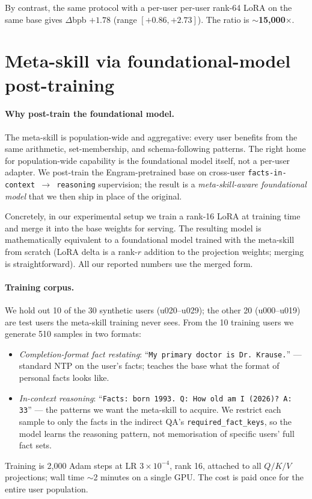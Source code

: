 \documentclass{article}
\begin{document}
By contrast, the same protocol with a per-user per-user rank-64 LoRA on
the same base gives $\Delta$bpb $+1.78$ (range $[+0.86, +2.73]$). The
ratio is \textbf{$\sim$15{,}000$\times$}.


\section{Meta-skill via foundational-model post-training}
\label{sec:metaskill}

\paragraph{Why post-train the foundational model.}
The meta-skill is population-wide and aggregative: every user benefits
from the same arithmetic, set-membership, and schema-following
patterns. The right home for population-wide capability is the
foundational model itself, not a per-user adapter. We post-train the
Engram-pretrained base on cross-user
\texttt{facts-in-context $\to$ reasoning} supervision; the result is a
\emph{meta-skill-aware foundational model} that we then ship in place
of the original.

Concretely, in our experimental setup we train a rank-16 LoRA at
training time and merge it into the base weights for serving. The
resulting model is mathematically equivalent to a foundational model
trained with the meta-skill from scratch (LoRA delta is a rank-$r$
addition to the projection weights; merging is straightforward). All
our reported numbers use the merged form.

\paragraph{Training corpus.}
We hold out 10 of the 30 synthetic users (u020--u029); the other 20
(u000--u019) are test users the meta-skill training never sees. From
the 10 training users we generate 510 samples in two formats:
\begin{itemize}[leftmargin=*,topsep=2pt,itemsep=1pt]
  \item \emph{Completion-format fact restating}: ``\texttt{My primary
        doctor is Dr.\ Krause.}'' — standard NTP on the user's facts;
        teaches the base what the format of personal facts looks like.
  \item \emph{In-context reasoning}: ``\texttt{Facts: born 1993.
        Q: How old am I (2026)? A: 33}'' — the patterns we want the
        meta-skill to acquire. We restrict each sample to only the
        facts in the indirect QA's \texttt{required\_fact\_keys}, so
        the model learns the reasoning pattern, not memorisation of
        specific users' full fact sets.
\end{itemize}
Training is 2{,}000 Adam steps at LR $3{\times}10^{-4}$, rank 16,
attached to all $Q/K/V$ projections; wall time $\sim$2 minutes on a
single GPU. The cost is paid once for the entire user population.
\end{document}
